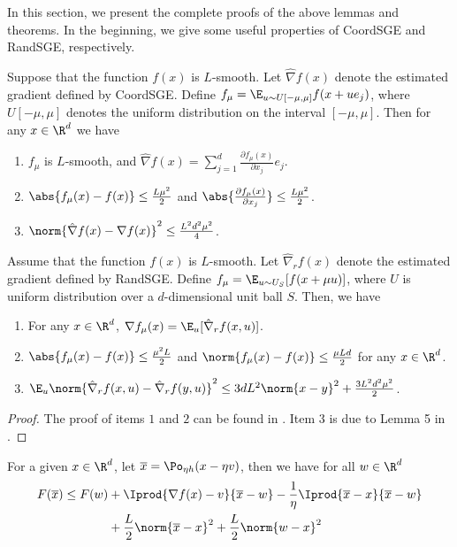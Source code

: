 In this section, we present the complete proofs of the above lemmas and theorems. In the beginning, we give some useful properties of CoordSGE and RandSGE, respectively.
\begin{lemma}\label{CooSGE}
Suppose that the function $f(x)$ is $L$-smooth. Let $\hat{\nabla} f(x)$ denote the estimated gradient defined by CoordSGE. Define $f_{\mu} = \E_{u\sim U[-\mu, \mu]} f(x+ue_j)$, where $U[-\mu,\mu]$ denotes the uniform distribution on the interval $[-\mu, \mu]$. Then for any $x \in \R^d$ we have 
\begin{enumerate}
\item $f_{\mu}$ is $L$-smooth, and 
$\hat{\nabla} f(x) = \sum_{j=1}^d \frac{\partial f_{\mu}(x)}{\partial x_j}e_j$.

\item $\abs{f_{\mu}(x) - f(x)} \leq \frac{L\mu^2}{2}$ and $\abs{\frac{\partial f_{\mu}(x)}{\partial x_j}} \leq \frac{L\mu^2}{2}$.
 
\item $\norm{\hat{\nabla} f(x) - {\nabla} f(x)} ^2 \leq \frac{L^2 d^2 \mu^2}{4}$.
\end{enumerate}  
\end{lemma}
\begin{lemma}\label{SGERand-approx}
Assume that the function $f(x)$ is $L$-smooth. Let $\hat{\nabla}_r f(x)$ denote the estimated gradient defined by RandSGE. Define $f_{\mu} = \E_{u\sim U_S}[f(x+\mu u)]$, where $U$ is uniform distribution over a $d$-dimensional unit ball $S$. Then, we have 
\begin{enumerate}
\item For any $x \in \R^d$, $\nabla f_{\mu}(x) = \E_u[\hat{\nabla}_r f(x,u)]$.\\
\item $\abs{f_{\mu}(x) - f(x)} \leq \frac{\mu^2 L}{2}$ and 
$\norm{f_{\mu}(x) - f(x)} \leq \frac{\mu L d}{2}$ for any $x \in \R^d$.\\
\item $\E_{u}\norm{\hat{\nabla}_r f(x,u) - \hat{\nabla}_r f(y,u)}^2 \leq 3dL^2\norm{x-y}^2 + \frac{3L^2d^2\mu^2}{2}$.
\end{enumerate}
\end{lemma}
\begin{proof}
The proof of items $1$ and $2$ can be found in \cite{gao2018information}. Item 3 is due to Lemma 5 in \cite{ji2019improved}.  
\end{proof}
\begin{lemma}\label{lemma1}
For a given $x \in \R^d$, let $\overline{x} = \Po_{\eta h}(x-\eta v)$, then we have for all $w\in \R^d$
\begin{equation}\label{eq10}
\begin{split}
F(\overline{x}) \leq F(w) &+ \Iprod{\nabla f(x)-v}{\overline{x}-w}-\frac{1}{\eta} \Iprod{\overline{x}-x}{\overline{x}-w}\\
&+\frac{L}{2}\norm{\overline{x}-x}^2+\frac{L}{2}\norm{w-x}^2 
\end{split}
\end{equation}
\end{lemma}
